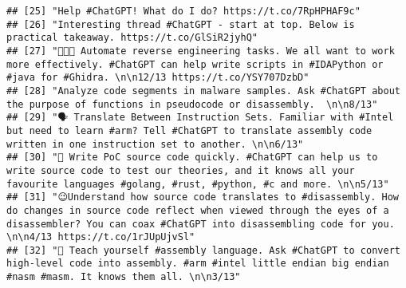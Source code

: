 \documentclass[
]{article}
\begin{document}
\begin{verbatim}
## [25] "Help #ChatGPT! What do I do? https://t.co/7RpHPHAF9c"                                                                                                                                                                                                                                                                                 
## [26] "Interesting thread #ChatGPT - start at top. Below is practical takeaway. https://t.co/GlSiR2jyhQ"                                                                                                                                                                                                                                     
## [27] "👩🏿‍💻 Automate reverse engineering tasks. We all want to work more effectively. #ChatGPT can help write scripts in #IDAPython or #java for #Ghidra. \n\n12/13 https://t.co/YSY707DzbD"                                                                                                                                               
## [28] "Analyze code segments in malware samples. Ask #ChatGPT about the purpose of functions in pseudocode or disassembly.  \n\n8/13"                                                                                                                                                                                                        
## [29] "🗣️ Translate Between Instruction Sets. Familiar with #Intel but need to learn #arm? Tell #ChatGPT to translate assembly code written in one instruction set to another. \n\n6/13"                                                                                                                                                      
## [30] "🧪 Write PoC source code quickly. #ChatGPT can help us to write source code to test our theories, and it knows all your favourite languages #golang, #rust, #python, #c and more. \n\n5/13"                                                                                                                                           
## [31] "😉Understand how source code translates to #disassembly. How do changes in source code reflect when viewed through the eyes of a disassembler? You can coax #ChatGPT into disassembling code for you.  \n\n4/13 https://t.co/1rJUpUjvSl"                                                                                              
## [32] "👾 Teach yourself #assembly language. Ask #ChatGPT to convert high-level code into assembly. #arm #intel little endian big endian #nasm #masm. It knows them all. \n\n3/13"                                                                                                                                                           

\end{verbatim}
\end{document}
